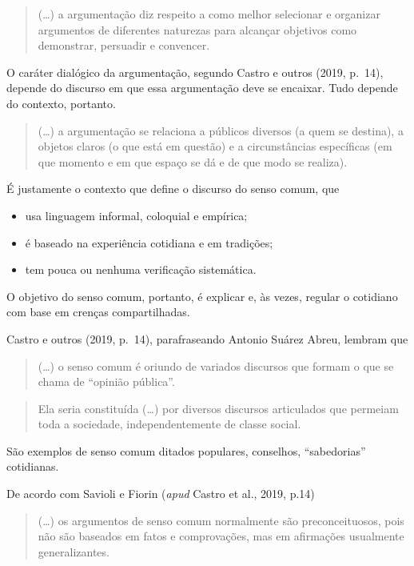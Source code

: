 \documentclass[
  letterpaper,
  DIV=11,
  numbers=noendperiod]{scrreprt}
\begin{document}
\begin{quote}
(\ldots) a argumentação diz respeito a como melhor selecionar e
organizar argumentos de diferentes naturezas para alcançar objetivos
como demonstrar, persuadir e convencer.
\end{quote}

O caráter dialógico da argumentação, segundo Castro e outros (2019,
p.~14), depende do discurso em que essa argumentação deve se encaixar.
Tudo depende do contexto, portanto.

\begin{quote}
(\ldots) a argumentação se relaciona a públicos diversos (a quem se
destina), a objetos claros (o que está em questão) e a circunstâncias
específicas (em que momento e em que espaço se dá e de que modo se
realiza).
\end{quote}

É justamente o contexto que define o discurso do senso comum, que

\begin{itemize}
\item
  usa linguagem informal, coloquial e empírica;
\item
  é baseado na experiência cotidiana e em tradições;
\item
  tem pouca ou nenhuma verificação sistemática.
\end{itemize}

O objetivo do senso comum, portanto, é explicar e, às vezes, regular o
cotidiano com base em crenças compartilhadas.

Castro e outros (2019, p.~14), parafraseando Antonio Suárez Abreu,
lembram que

\begin{quote}
(\ldots) o senso comum é oriundo de variados discursos que formam o que
se chama de ``opinião pública''.
\end{quote}

\begin{quote}
Ela seria constituída (\ldots) por diversos discursos articulados que
permeiam toda a sociedade, independentemente de classe social.
\end{quote}

São exemplos de senso comum ditados populares, conselhos, ``sabedorias''
cotidianas.

De acordo com Savioli e Fiorin (\emph{apud} Castro et al., 2019, p.14)

\begin{quote}
(\ldots) os argumentos de senso comum normalmente são preconceituosos,
pois não são baseados em fatos e comprovações, mas em afirmações
usualmente generalizantes.
\end{quote}
\end{document}
